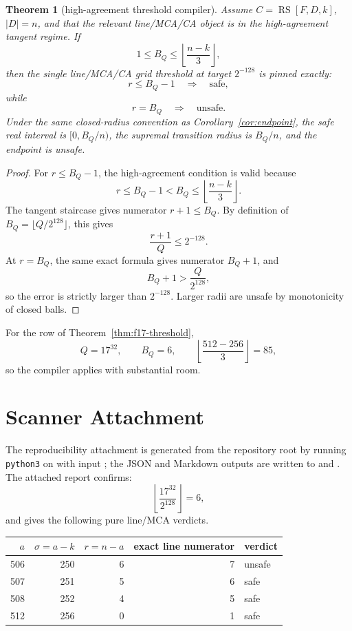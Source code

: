 \documentclass[11pt]{article}
\newtheorem{theorem}{Theorem}
\theoremstyle{remark}
\newcommand{\RS}{\operatorname{RS}}
\begin{document}
\begin{theorem}[high-agreement threshold compiler]
\label{thm:compiler}
Assume \(C=\RS[F,D,k]\), \(|D|=n\), and that the relevant line/MCA/CA object is
in the high-agreement tangent regime.  If
\[
  1\le B_Q\le \left\lfloor\frac{n-k}{3}\right\rfloor,
\]
then the single line/MCA/CA grid threshold at target \(2^{-128}\) is pinned
exactly:
\[
  r\le B_Q-1 \quad\Longrightarrow\quad \text{safe},
\]
while
\[
  r=B_Q \quad\Longrightarrow\quad \text{unsafe}.
\]
Under the same closed-radius convention as Corollary~\ref{cor:endpoint}, the
safe real interval is \([0,B_Q/n)\), the supremal transition radius is \(B_Q/n\),
and the endpoint is unsafe.
\end{theorem}

\begin{proof}
For \(r\le B_Q-1\), the high-agreement condition is valid because
\[
  r\le B_Q-1< B_Q\le\left\lfloor\frac{n-k}{3}\right\rfloor.
\]
The tangent staircase gives numerator \(r+1\le B_Q\).  By definition of
\(B_Q=\lfloor Q/2^{128}\rfloor\), this gives
\[
  \frac{r+1}{Q}\le 2^{-128}.
\]
At \(r=B_Q\), the same exact formula gives numerator \(B_Q+1\), and
\[
  B_Q+1>\frac{Q}{2^{128}},
\]
so the error is strictly larger than \(2^{-128}\).  Larger radii are unsafe by
monotonicity of closed balls.
\end{proof}

For the row of Theorem~\ref{thm:f17-threshold},
\[
  Q=17^{32},\qquad B_Q=6,\qquad
  \left\lfloor\frac{512-256}{3}\right\rfloor=85,
\]
so the compiler applies with substantial room.

\section{Scanner Attachment}
\label{sec:scanner}

The reproducibility attachment is generated from the repository root by running
\texttt{python3} on
 with input
;
the JSON and Markdown outputs are written to
and
.
The attached report confirms:
\[
  \left\lfloor\frac{17^{32}}{2^{128}}\right\rfloor=6,
\]
and gives the following pure line/MCA verdicts.

\begin{center}
\begin{tabular}{rrrrl}
\toprule
\(a\) & \(\sigma=a-k\) & \(r=n-a\) & exact line numerator & verdict\\
\midrule
506 & 250 & 6 & 7 & unsafe\\
507 & 251 & 5 & 6 & safe\\
508 & 252 & 4 & 5 & safe\\
512 & 256 & 0 & 1 & safe\\
\bottomrule
\end{tabular}
\end{center}
\end{document}

